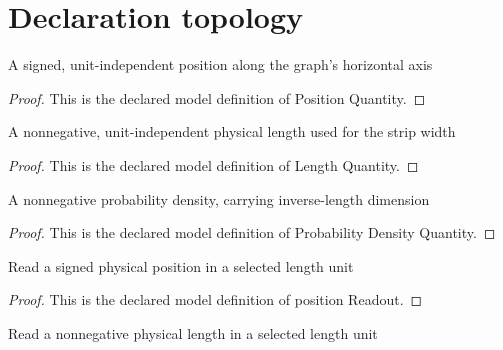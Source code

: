 \section{Declaration topology}
\begin{definition}
  \label{def:physics:phyx-mini-0501:phyxminiproblems-problemphyxmini0501-positionquantity}
  A signed, unit-independent position along the graph's horizontal axis
\end{definition}
\begin{proof}
  This is the declared model definition of Position Quantity.
\end{proof}
\begin{definition}
  \label{def:physics:phyx-mini-0501:phyxminiproblems-problemphyxmini0501-lengthquantity}
  A nonnegative, unit-independent physical length used for the strip width
\end{definition}
\begin{proof}
  This is the declared model definition of Length Quantity.
\end{proof}
\begin{definition}
  \label{def:physics:phyx-mini-0501:phyxminiproblems-problemphyxmini0501-probabilitydensityquantity}
  A nonnegative probability density, carrying inverse-length dimension
\end{definition}
\begin{proof}
  This is the declared model definition of Probability Density Quantity.
\end{proof}
\begin{definition}
  \label{def:physics:phyx-mini-0501:phyxminiproblems-problemphyxmini0501-positionreadout}
  Read a signed physical position in a selected length unit
\end{definition}
\begin{proof}
  This is the declared model definition of position Readout.
\end{proof}
\begin{definition}
  \label{def:physics:phyx-mini-0501:phyxminiproblems-problemphyxmini0501-lengthreadout}
  Read a nonnegative physical length in a selected length unit
\end{definition}
